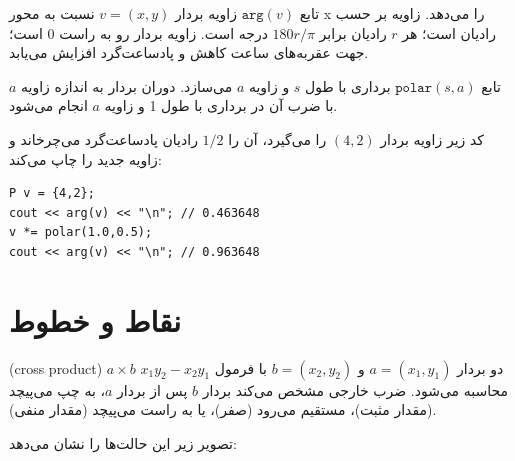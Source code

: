 تابع $\texttt{arg}(v)$ زاویه بردار $v=(x,y)$ نسبت به محور x را می‌دهد.
زاویه بر حسب رادیان است؛
هر $r$ رادیان برابر $180 r/\pi$ درجه است.
زاویه بردار رو به راست 0 است؛
جهت عقربه‌های ساعت کاهش و پادساعت‌گرد افزایش می‌یابد.

تابع $\texttt{polar}(s,a)$ برداری با طول $s$ و زاویه $a$ می‌سازد.
دوران بردار به اندازه زاویه $a$ با ضرب آن در برداری با طول 1 و زاویه $a$ انجام می‌شود.

کد زیر زاویه بردار $(4,2)$ را می‌گیرد، آن را $1/2$ رادیان پادساعت‌گرد می‌چرخاند و زاویه جدید را چاپ می‌کند:

\begin{lstlisting}
P v = {4,2};
cout << arg(v) << "\n"; // 0.463648
v *= polar(1.0,0.5);
cout << arg(v) << "\n"; // 0.963648
\end{lstlisting}

\section{نقاط و خطوط}


 (cross product) $a \times b$ دو بردار $a=(x_1,y_1)$ و $b=(x_2,y_2)$ با فرمول $x_1 y_2 - x_2 y_1$ محاسبه می‌شود.
ضرب خارجی مشخص می‌کند بردار $b$ پس از بردار $a$،
به چپ می‌پیچد (مقدار مثبت)، مستقیم می‌رود (صفر)،
یا به راست می‌پیچد (مقدار منفی).

تصویر زیر این حالت‌ها را نشان می‌دهد:
\begin{center}
\end{center}

